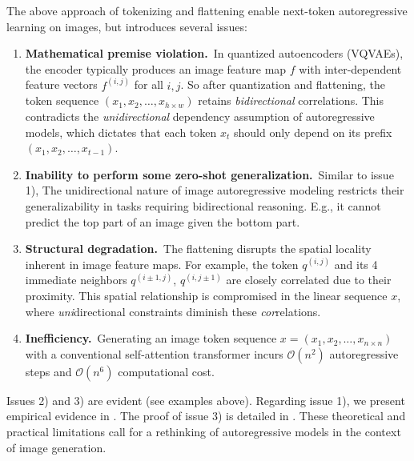 The above approach of tokenizing and flattening enable next-token autoregressive learning on images, but introduces several issues:

\begin{enumerate}[label=\arabic*),topsep=1pt,itemsep=2pt,leftmargin=20pt]
\item \textbf{Mathematical premise violation.}\, In quantized autoencoders (VQVAEs), the encoder typically produces an image feature map $f$ with inter-dependent feature vectors $f^{(i,j)}$ for all $i,j$.
So after quantization and flattening, the token sequence $(x_1, x_2, \dots, x_{h\times w})$ retains \textit{bidirectional} correlations.
This contradicts the \textit{unidirectional} dependency assumption of autoregressive models, which dictates that each token $x_t$ should only depend on its prefix $(x_1, x_2, \dots, x_{t-1})$.

\item \textbf{Inability to perform some zero-shot generalization.}\, Similar to issue 1), The unidirectional nature of image autoregressive modeling restricts their generalizability in tasks requiring bidirectional reasoning. E.g., it cannot predict the top part of an image given the bottom part.

\item \textbf{Structural degradation.}\, The flattening disrupts the spatial locality inherent in image feature maps. For example, the token $q^{(i,j)}$ and its 4 immediate neighbors $q^{(i\pm 1,j)}$, $q^{(i,j\pm 1)}$ are closely correlated due to their proximity.
This spatial relationship is compromised in the linear sequence $x$, where \textit{uni}directional constraints diminish these \textit{cor}relations.

\item \textbf{Inefficiency.}\, Generating an image token sequence $x = (x_1, x_2, \dots, x_{n\times n})$ with a conventional self-attention transformer incurs $\mathcal{O}(n^2)$ autoregressive steps and $\mathcal{O}(n^6)$ computational cost.
\end{enumerate}

Issues 2) and 3) are evident (see examples above).
Regarding issue 1), we present empirical evidence in .
The proof of issue 3) is detailed in .
These theoretical and practical limitations call for a rethinking of autoregressive models in the context of image generation.

